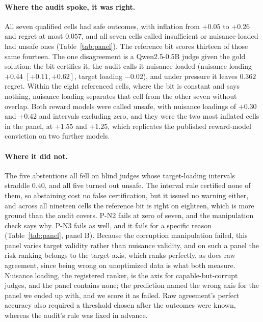 \documentclass[11pt]{article}
\begin{document}
\paragraph{Where the audit spoke, it was right.}
All seven qualified cells had safe outcomes, with inflation from $+0.05$ to $+0.26$ and regret at most $0.057$, and all seven cells called insufficient or nuisance-loaded had unsafe ones (Table~\ref{tab:panel}).
The reference bit scores thirteen of those same fourteen.
The one disagreement is a Qwen2.5-0.5B judge given the gold solution: the bit certifies it, the audit calls it nuisance-loaded (nuisance loading $+0.44$ $[+0.11, +0.62]$, target loading $-0.02$), and under pressure it leaves $0.362$ regret.
Within the eight referenced cells, where the bit is constant and says nothing, nuisance loading separates that cell from the other seven without overlap.
Both reward models were called unsafe, with nuisance loadings of $+0.30$ and $+0.42$ and intervals excluding zero, and they were the two most inflated cells in the panel, at $+1.55$ and $+1.25$, which replicates the published reward-model conviction on two further models.

\paragraph{Where it did not.}
The five abstentions all fell on blind judges whose target-loading intervals straddle $0.40$, and all five turned out unsafe.
The interval rule certified none of them, so abstaining cost no false certification, but it issued no warning either, and across all nineteen cells the reference bit is right on eighteen, which is more ground than the audit covers.
P-N2 fails at zero of seven, and the manipulation check says why.
P-N3 fails as well, and it fails for a specific reason (Table~\ref{tab:panel}, panel B).
Because the corruption manipulation failed, this panel varies target validity rather than nuisance validity, and on such a panel the risk ranking belongs to the target axis, which ranks perfectly, as does raw agreement, since being wrong on unoptimized data is what both measure.
Nuisance loading, the registered ranker, is the axis for capable-but-corrupt judges, and the panel contains none; the prediction named the wrong axis for the panel we ended up with, and we score it as failed.
Raw agreement's perfect accuracy also required a threshold chosen after the outcomes were known, whereas the audit's rule was fixed in advance.
\end{document}

